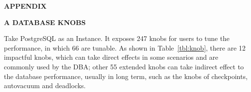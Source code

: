 \noindent \textbf{\large APPENDIX}
\vspace{1em}  


\noindent \textbf{\large A DATABASE KNOBS}
\label{sec: databaseKnobs}

Take PostgreSQL as an Instance. It exposes 247 knobs for users to tune the performance, in which 66 are tunable. As shown in Table~\ref{tbl:knob}, there are 12 impactful knobs, which can take direct effects in some scenarios and are commonly used by the DBA; other 55 extended knobs can take indirect effect to the database performance, usually in long term, such as the knobs of checkpoints, autovacuum and deadlocks.

